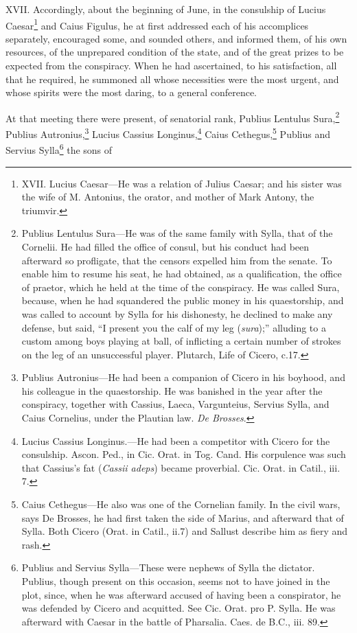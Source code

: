 XVII. Accordingly, about the beginning of June, in the consulship of
Lucius Caesar\footnote{XVII. Lucius Caesar—He was a relation of Julius Caesar; and his
sister was the wife of M. Antonius, the orator, and mother of Mark
Antony, the triumvir.} and Caius Figulus, he at first addressed each of his
accomplices separately, encouraged some, and sounded others, and
informed them, of his own resources, of the unprepared condition of
the state, and of the great prizes to be expected from the conspiracy.
When he had ascertained, to his satisfaction, all that he required, he
summoned all whose necessities were the most urgent, and whose spirits
were the most daring, to a general conference.

At that meeting there were present, of senatorial rank, Publius
Lentulus Sura,\footnote{Publius Lentulus Sura—He was of the same family with Sylla,
that of the Cornelii. He had filled the office of consul, but his
conduct had been afterward so profligate, that the censors expelled
him from the senate. To enable him to resume his seat, he had
obtained, as a qualification, the office of praetor, which he held at
the time of the conspiracy. He was called Sura, because, when he had
squandered the public money in his quaestorship, and was called to
account by Sylla for his dishonesty, he declined to make any defense,
but said, ``I present you the calf of my leg (\emph{sura});'' alluding to a
custom among boys playing at ball, of inflicting a certain number of
strokes on the leg of an unsuccessful player. Plutarch, Life of
Cicero, c.17.} Publius Autronius,\footnote{Publius Autronius—He had been a companion of Cicero in his
boyhood, and his colleague in the quaestorship. He was banished in the
year after the conspiracy, together with Cassius, Laeca, Vargunteius,
Servius Sylla, and Caius Cornelius, under the Plautian law. \emph{De
Brosses}.} Lucius Cassius Longinus,\footnote{Lucius Cassius Longinus.—He had been a competitor with Cicero
for the consulship. Ascon. Ped., in Cic. Orat. in Tog. Cand. His
corpulence was such that Cassius's fat (\emph{Cassii adeps}) became
proverbial. Cic. Orat. in Catil., iii. 7.}
Caius Cethegus,\footnote{Caius Cethegus—He also was one of the Cornelian family. In the
civil wars, says De Brosses, he had first taken the side of Marius,
and afterward that of Sylla. Both Cicero (Orat. in Catil., ii.7) and
Sallust describe him as fiery and rash.} Publius and Servius Sylla\footnote{Publius and Servius Sylla—These were nephews of Sylla the
dictator. Publius, though present on this occasion, seems not to have
joined in the plot, since, when he was afterward accused of having
been a conspirator, he was defended by Cicero and acquitted. See Cic.
Orat. pro P. Sylla. He was afterward with Caesar in the battle of
Pharsalia. Caes. de B.C., iii. 89.} the sons of
